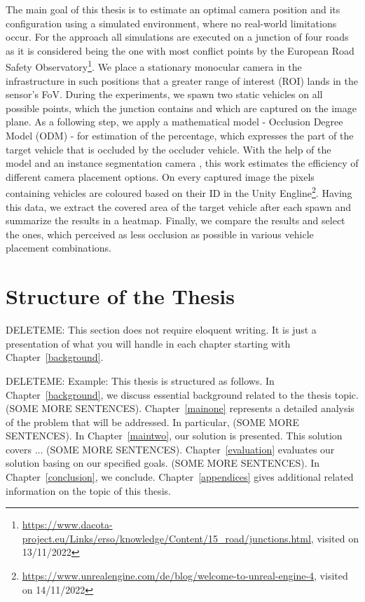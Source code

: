 The main goal of this thesis is to estimate an optimal camera position and its configuration using a simulated environment, where no real-world limitations occur. For the approach all simulations are executed on a junction of four roads as it is considered being the one with most conflict points by the European Road Safety Observatory\footnote{\url{https://www.dacota-project.eu/Links/erso/knowledge/Content/15_road/junctions.html}, visited on 13/11/2022}. We place a stationary monocular camera in the infrastructure in such positions that a greater range of interest (ROI) lands in the sensor's FoV. During the experiments, we spawn two static vehicles on all possible points, which the junction contains and which are captured on the image plane. As a following step, we apply a mathematical model - Occlusion Degree Model (ODM) \cite{occlusion_degree_model} - for estimation of the percentage, which expresses the part of the target vehicle that is occluded by the occluder vehicle. With the help of the model and an instance segmentation camera \cite{instance_segmenatation_cam}, this work estimates the efficiency of different camera placement options. On every captured image the pixels containing vehicles are coloured based on their ID in the Unity Engline\footnote{\url{https://www.unrealengine.com/de/blog/welcome-to-unreal-engine-4}, visited on 14/11/2022}. Having this data, we extract the covered area of the target vehicle after each spawn and summarize the results in a heatmap. Finally, we compare the results and select the ones, which perceived as less occlusion as possible in various vehicle placement combinations. 


\section{Structure of the Thesis}
DELETEME: This section does not require eloquent writing. It is just a presentation of what you will handle in each chapter starting with Chapter~\ref{background}.

DELETEME: Example: This thesis is structured as follows. In Chapter~\ref{background}, we discuss essential background related to the thesis topic. (SOME MORE SENTENCES). Chapter~\ref{mainone} represents a detailed analysis of the problem that will be addressed. In particular, (SOME MORE SENTENCES). In Chapter~\ref{maintwo}, our solution is presented. This solution covers ... (SOME MORE SENTENCES). Chapter~\ref{evaluation} evaluates our solution basing on our specified goals. (SOME MORE SENTENCES). In Chapter~\ref{conclusion}, we conclude. Chapter~\ref{appendices} gives additional related information on the topic of this thesis.

